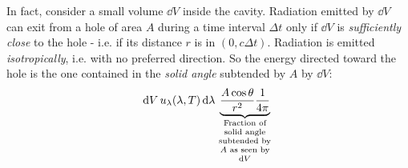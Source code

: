 \documentclass[../template.tex]{subfiles}
\begin{document}

In fact, consider a small volume $\dd{V}$ inside the cavity. Radiation emitted by $\dd{V}$ can exit from a hole of area $A$ during a time interval $\Delta t$ only if $\dd{V}$ is \textit{sufficiently close} to the hole - i.e. if its distance $r$ is in $(0, c \Delta t)$. Radiation is emitted \textit{isotropically}, i.e. with no preferred direction. So the energy directed toward the hole is the one contained in the \textit{solid angle} subtended by $A$  by $\dd{V}$:
\begin{align*}
    \dd{V} u_\lambda (\lambda, T) \dd{\lambda} \underbrace{\frac{A \cos \theta}{r^2} \frac{1}{4 \pi}  }_{\parbox{5em}{\centering \scriptsize Fraction of solid angle subtended by $A$ as seen by $\dd{V}$}} 
\end{align*}  %

\begin{exo}[8]
    
\end{exo}

\begin{exo}[9]
    
\end{exo}
\end{document}
